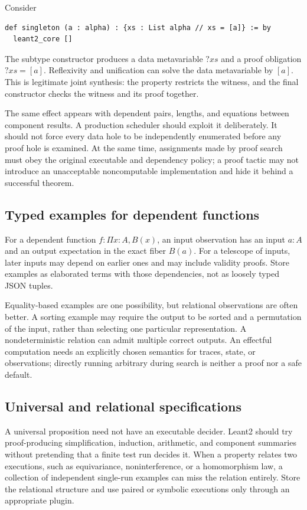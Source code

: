 \documentclass[11pt,letterpaper]{article}
\newcommand{\code}[1]{\texttt{\detokenize{#1}}}
\theoremstyle{definition}
\theoremstyle{remark}
\begin{document}
Consider
\Needspace{83pt}
\begin{lstlisting}
def singleton (a : alpha) : {xs : List alpha // xs = [a]} := by
  leant2_core []
\end{lstlisting}
The subtype constructor produces a data metavariable $?xs$ and a proof obligation $?xs=[a]$. Reflexivity and unification can solve the data metavariable by $[a]$. This is legitimate joint synthesis: the property restricts the witness, and the final constructor checks the witness and its proof together.

The same effect appears with dependent pairs, lengths, and equations between component results. A production scheduler should exploit it deliberately. It should not force every data hole to be independently enumerated before any proof hole is examined. At the same time, assignments made by proof search must obey the original executable and dependency policy; a proof tactic may not introduce an unacceptable noncomputable implementation and hide it behind a successful theorem.

\subsection{Typed examples for dependent functions}

For a dependent function $f:\Pi x:A,B(x)$, an input observation has an input $a:A$ and an output expectation in the exact fiber $B(a)$. For a telescope of inputs, later inputs may depend on earlier ones and may include validity proofs. Store examples as elaborated terms with those dependencies, not as loosely typed JSON tuples.

Equality-based examples are one possibility, but relational observations are often better. A sorting example may require the output to be sorted and a permutation of the input, rather than selecting one particular representation. A nondeterministic relation can admit multiple correct outputs. An effectful computation needs an explicitly chosen semantics for traces, state, or observations; directly running arbitrary \code{IO} during search is neither a proof nor a safe default.

\subsection{Universal and relational specifications}

A universal proposition need not have an executable decider. Leant2 should try proof-producing simplification, induction, arithmetic, and component summaries without pretending that a finite test run decides it. When a property relates two executions, such as equivariance, noninterference, or a homomorphism law, a collection of independent single-run examples can miss the relation entirely. Store the relational structure and use paired or symbolic executions only through an appropriate plugin.
\end{document}
